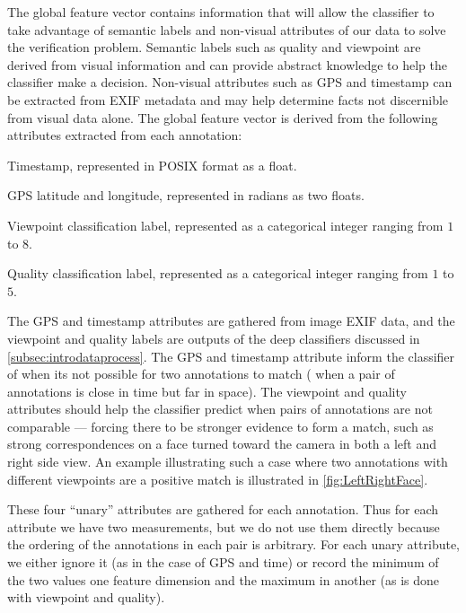 The global feature vector contains information that will allow the classifier to take advantage of semantic
  labels and non-visual attributes of our data to solve the verification problem.
Semantic labels such as quality and viewpoint are derived from visual information and can provide abstract
  knowledge to help the classifier make a decision.
Non-visual attributes such as GPS and timestamp can be extracted from EXIF metadata and may help determine facts
  not discernible from visual data alone.
The global feature vector is derived from the following attributes extracted from each annotation:
\begin{enumln}

    \item Timestamp, represented in POSIX format as a float.

    \item GPS latitude and longitude, represented in radians as two floats. 

    \item Viewpoint classification label, represented as a categorical integer ranging from $1$ to $8$.

    \item Quality classification label, represented as a categorical integer ranging from $1$ to $5$.
\end{enumln}
The GPS and timestamp attributes are gathered from image EXIF data, and the viewpoint and quality labels are
  outputs of the deep classifiers discussed in \cref{subsec:introdataprocess}.
The GPS and timestamp attribute inform the classifier of when its not possible for two annotations to match
  (\eg{} when a pair of annotations is close in time but far in space).
The viewpoint and quality attributes should help the classifier predict when pairs of annotations are not
  comparable --- forcing there to be stronger evidence to form a match, such as strong correspondences on a face
  turned toward the camera in both a left and right side view.
An example illustrating such a case where two annotations with different viewpoints are a positive match is
  illustrated in \cref{fig:LeftRightFace}.

\LeftRightFace{}

These four ``unary'' attributes are gathered for each annotation.
Thus for each attribute we have two measurements, but we do not use them directly because the ordering of the
  annotations in each pair is arbitrary.
For each unary attribute, we either ignore it (as in the case of GPS and time) or record the minimum of the two
  values one feature dimension and the maximum in another (as is done with viewpoint and quality).

